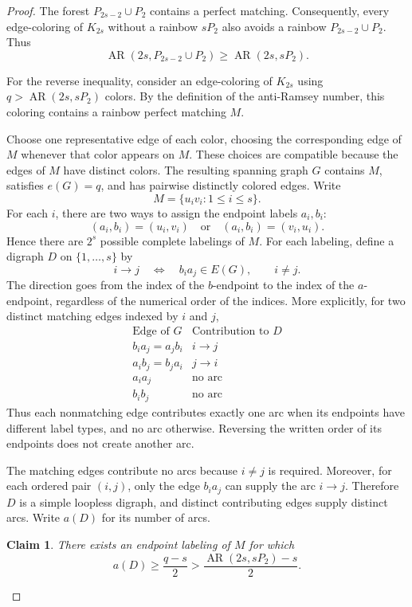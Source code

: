 \documentclass[10pt,a4paper]{article}
\newtheorem{claim}[theorem]{Claim}
\DeclareMathOperator{\AR}{AR}
\begin{document}
\begin{proof}
	The forest $P_{2s-2}\cup P_2$ contains a perfect matching.
	Consequently, every edge-coloring of $K_{2s}$ without
	a rainbow $sP_2$ also avoids a rainbow $P_{2s-2}\cup P_2$.
	Thus
	\[
	\AR(2s,P_{2s-2}\cup P_2)\ge\AR(2s,sP_2).
	\]
	
	For the reverse inequality, consider an edge-coloring
	of $K_{2s}$ using $q>\AR(2s,sP_2)$ colors.
	By the definition of the anti-Ramsey number, this coloring
	contains a rainbow perfect matching $M$.
	
	Choose one representative edge of each color, choosing
	the corresponding edge of $M$ whenever that color appears
	on $M$. These choices are compatible because the edges
	of $M$ have distinct colors. The resulting spanning
	graph $G$ contains $M$, satisfies $e(G)=q$, and has
	pairwise distinctly colored edges.	
	Write
	\[
	M=\{u_i v_i:1\le i\le s\}.
	\]
	For each $i$, there are two ways to assign the endpoint
	labels $a_i,b_i$:
	\[
	(a_i,b_i)=(u_i,v_i)
	\quad\text{or}\quad
	(a_i,b_i)=(v_i,u_i).
	\]
	Hence there are $2^s$ possible complete labelings of $M$.
	For each labeling, define a digraph $D$ on $\{1,\ldots,s\}$ by
	\[
	i\to j
	\quad\Longleftrightarrow\quad
	b_i a_j\in E(G),
	\qquad i\ne j.
	\]
	The direction goes from the index of the $b$-endpoint
	to the index of the $a$-endpoint, regardless of the
	numerical order of the indices. More explicitly,
	for two distinct matching edges indexed by $i$ and $j$,
	\[
	\begin{array}{c|c}
		\text{Edge of }G & \text{Contribution to }D\\ \hline
		b_i a_j=a_j b_i & i\to j\\
		a_i b_j=b_j a_i & j\to i\\
		a_i a_j & \text{no arc}\\
		b_i b_j & \text{no arc}
	\end{array}
	\]
	Thus each nonmatching edge contributes exactly one arc
	when its endpoints have different label types, and
	no arc otherwise. Reversing the written order of its
	endpoints does not create another arc.
	
	The matching edges contribute no arcs because $i\ne j$
	is required. Moreover, for each ordered pair $(i,j)$,
	only the edge $b_i a_j$ can supply the arc $i\to j$.
	Therefore $D$ is a simple loopless digraph, and distinct
	contributing edges supply distinct arcs.
	Write $a(D)$ for its number of arcs.
	
	\begin{claim}\label{cl:max-labeling}
		There exists an endpoint labeling of $M$ for which
		\[
		a(D)\ge\frac{q-s}{2}
		>\frac{\AR(2s,sP_2)-s}{2}.
		\]
	\end{claim}
	

\end{proof}
\end{document}
